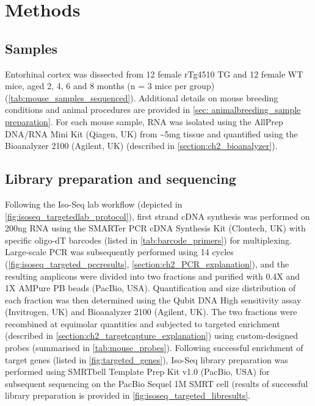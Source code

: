 \restoregeometry

 

\section{Methods}

\subsection{Samples}
Entorhinal cortex was dissected from 12 female rTg4510 TG and 12 female WT mice, aged 2, 4, 6 and 8 months (n = 3 mice per group) (\cref{tab:mouse_samples_sequenced}). Additional details on mouse breeding conditions and animal procedures are provided in \cref{sec: animalbreeding_sample preparation}. For each mouse sample, RNA was isolated using the AllPrep DNA/RNA Mini Kit (Qiagen, UK) from \textasciitilde5mg tissue and quantified using the Bioanalyzer 2100 (Agilent, UK) (described in \cref{section:ch2_bioanalyzer}). 
 
\subsection{Library preparation and sequencing}
Following the Iso-Seq lab workflow (depicted in \cref{fig:isoseq_targetedlab_protocol}), first strand cDNA synthesis was performed on 200ng RNA using the SMARTer PCR cDNA Synthesis Kit (Clontech, UK) with specific oligo-dT barcodes (listed in \cref{tab:barcode_primers}) for multiplexing. Large-scale PCR was subsequently performed using 14 cycles (\cref{fig:isoseq_targeted_pccresults}, \cref{section:ch2_PCR_explanation}), and the resulting amplicons were divided into two fractions and purified with 0.4X and 1X AMPure PB beads (PacBio, USA). Quantification and size distribution of each fraction was then determined using the Qubit DNA High sensitivity assay (Invitrogen, UK) and Bioanalyzer 2100 (Agilent, UK). The two fractions were recombined at equimolar quantities and subjected to targeted enrichment (described in \cref{section:ch2_targetcapture_explanation}) using custom-designed probes (summarised in \cref{tab:mouse_probes}). Following successful enrichment of target genes (listed in \cref{fig:targeted_genes}), Iso-Seq library preparation was performed using SMRTbell Template Prep Kit v1.0 (PacBio, USA) for subsequent sequencing on the PacBio Sequel 1M SMRT cell (results of successful library preparation is provided in \cref{fig:isoseq_targeted_libresults}. 

